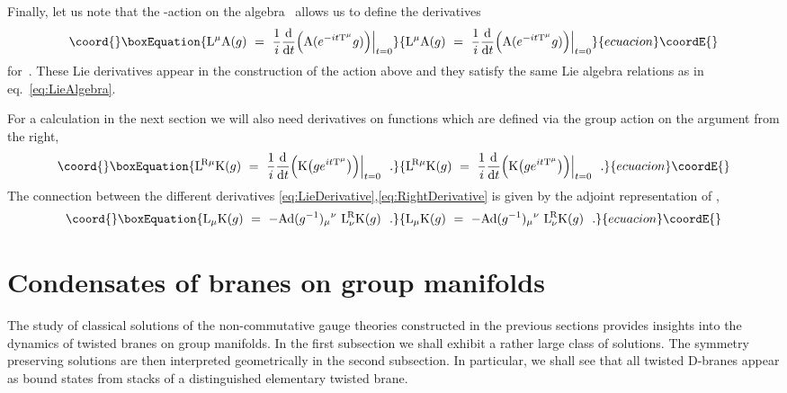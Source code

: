 \documentclass[12pt,a4paper]{article}
\providecommand{\mc}{\mathcal} %
\def\Mat{{\text{\rm Mat}}} %
\def\tT{{\rm T}} %
\def\tR{{\rm R}} %
\def\tK{{\rm K}} %
\def\tA{{\rm A}}
\def\tL{{\rm L}}
\begin{document}
Finally, let us note that the \coordHE{}-action on the 
algebra~\myHighlight{$\mc{A}^{N(a)}$}\coordHE{} allows us to define the derivatives
\begin{equation}\coord{}\boxEquation{
  \label{eq:LieDerivative}
  \tL^\mu\tA(g)
  \ =\ \frac{1}{i}
   \frac{\text{d}}{\text{d}t}\Bigl(\tA(e^{-it\tT^\mu}g)\Bigr)\Bigr|_{t=0}
}{
  \tL^\mu\tA(g)
  \ =\ \frac{1}{i}
   \frac{\text{d}}{\text{d}t}\Bigl(\tA(e^{-it\tT^\mu}g)\Bigr)\Bigr|_{t=0}
}{ecuacion}\coordE{}\end{equation}
for~\myHighlight{$A\in\mc{A}^{N(a)}$}\coordHE{}. These Lie derivatives appear in the 
construction of the action above and they satisfy the same 
Lie algebra relations as in eq.~\eqref{eq:LieAlgebra}. 

For a calculation in the next section we will also need derivatives on
functions \myHighlight{$\tK: G\to \Mat(N)$}\coordHE{} which are defined via the group action on the
argument from the right,
\begin{equation}\coord{}\boxEquation{
  \label{eq:RightDerivative}
  \tL^{\!\tR\mu}\tK(g)
  \ =\ \frac{1}{i}
   \frac{\text{d}}{\text{d}t}\Bigl(\tK\bigl(ge^{it\tT^\mu}\bigr)\Bigr)\Bigr|_{t=0}\ \ .
}{
  \tL^{\!\tR\mu}\tK(g)
  \ =\ \frac{1}{i}
   \frac{\text{d}}{\text{d}t}\Bigl(\tK\bigl(ge^{it\tT^\mu}\bigr)\Bigr)\Bigr|_{t=0}\ \ .
}{ecuacion}\coordE{}\end{equation}
The connection between the different derivatives
\eqref{eq:LieDerivative},\eqref{eq:RightDerivative} is given by the adjoint
representation of \coordHE{},
\begin{equation}\coord{}\boxEquation{
\tL_{\mu}\tK(g)\ =\ - \text{Ad}(g^{-1}){_{\mu}}^{\nu} \ 
\tL^{\!\tR}_{\nu} \tK(g)\ \ .
}{
\tL_{\mu}\tK(g)\ =\ - \text{Ad}(g^{-1}){_{\mu}}^{\nu} \ 
\tL^{\!\tR}_{\nu} \tK(g)\ \ .
}{ecuacion}\coordE{}\end{equation}

\section{Condensates of branes on group manifolds}

The study of classical solutions of the non-commutative gauge 
theories constructed in the previous sections provides insights
into the dynamics of twisted branes on group manifolds. In the 
first subsection we shall exhibit a rather large class of 
solutions. The symmetry preserving solutions are then interpreted
geometrically in the second subsection. In particular, we shall 
see that all twisted D-branes appear as bound states from stacks 
of a distinguished elementary twisted brane.   
\end{document}
